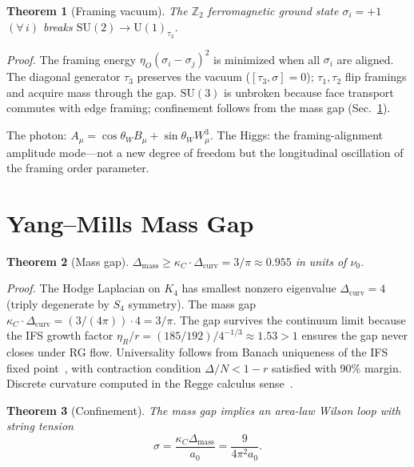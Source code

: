 \documentclass[11pt,twocolumn]{article}
\newtheorem{theorem}{Theorem}
\begin{document}
\begin{theorem}[Framing vacuum]
\label{thm:ewsb}
The $\mathbb{Z}_2$ ferromagnetic ground state $\sigma_i=+1$ $(\forall\,i)$ breaks $\mathrm{SU}(2)\to\mathrm{U}(1)_{\tau_3}$.
\end{theorem}

\textit{Proof.}
The framing energy $\eta_O(\sigma_i-\sigma_j)^2$ is minimized when all $\sigma_i$ are aligned.
The diagonal generator $\tau_3$ preserves the vacuum ($[\tau_3,\sigma]=0$); $\tau_1,\tau_2$ flip framings and acquire mass through the gap.
$\mathrm{SU}(3)$ is unbroken because face transport commutes with edge framing; confinement follows from the mass gap (Sec.~\ref{sec:massgap}).

The photon: $A_\mu=\cos\theta_W B_\mu+\sin\theta_W W^3_\mu$.
The Higgs: the framing-alignment amplitude mode---not a new degree of freedom but the longitudinal oscillation of the framing order parameter.

\section{Yang--Mills Mass Gap}
\label{sec:massgap}

\begin{theorem}[Mass gap]
\label{thm:massgap}
$\Delta_{\mathrm{mass}}\geq\kappa_C\cdot\Delta_{\mathrm{curv}}=3/\pi\approx 0.955$ in units of $\nu_0$.
\end{theorem}

\textit{Proof.}
The Hodge Laplacian on $K_4$ has smallest nonzero eigenvalue $\Delta_{\mathrm{curv}}=4$ (triply degenerate by $S_4$ symmetry).
The mass gap $\kappa_C\cdot\Delta_{\mathrm{curv}}=(3/(4\pi))\cdot 4=3/\pi$.
The gap survives the continuum limit because the IFS growth factor $\eta_R/r=(185/192)/4^{-1/3}\approx 1.53>1$ ensures the gap never closes under RG flow.
Universality follows from Banach uniqueness of the IFS fixed point~\cite{hutchinson1981}, with contraction condition $\Delta/N<1-r$ satisfied with 90\% margin.
Discrete curvature computed in the Regge calculus sense~\cite{regge1961}.

\begin{theorem}[Confinement]
\label{thm:confine}
The mass gap implies an area-law Wilson loop with string tension
\begin{equation}
\sigma=\frac{\kappa_C\Delta_{\mathrm{mass}}}{a_0}=\frac{9}{4\pi^2 a_0}.
\label{eq:string}
\end{equation}
\end{theorem}
\end{document}
